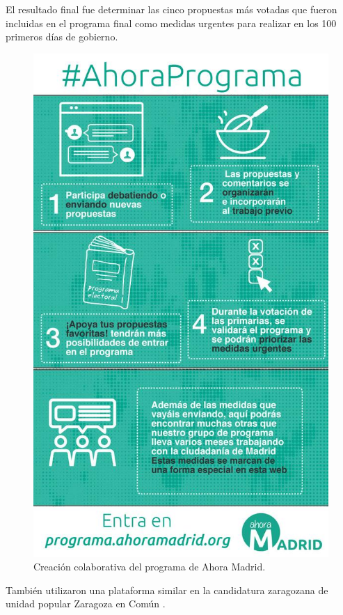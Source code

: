 El resultado final fue determinar las cinco propuestas más votadas que fueron incluidas en el programa final como medidas urgentes para realizar en los 100 primeros días de gobierno. 

\begin{figure}[H]
\centering
\includegraphics[keepaspectratio, scale=0.25]{Media/Captures/programaAhoraMadrid.jpg}
\caption{Creación colaborativa del programa de Ahora Madrid.}
\label{fig:programaAhoraMadrid}
\end{figure}

También utilizaron una plataforma similar en la candidatura zaragozana de unidad popular Zaragoza en Común \cite{ref:ganemosZaragoza}.

